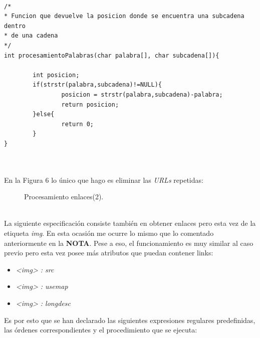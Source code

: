 \documentclass[10pt, a4paper,spanish]{article}
\begin{document}
\begin{lstlisting}

/*
* Funcion que devuelve la posicion donde se encuentra una subcadena dentro 
* de una cadena
*/
int procesamientoPalabras(char palabra[], char subcadena[]){

        int posicion;
        if(strstr(palabra,subcadena)!=NULL){
                posicion = strstr(palabra,subcadena)-palabra;
                return posicion;
        }else{
                return 0;
        }
}


\end{lstlisting}

\noindent \\ En la Figura 6 lo único que hago es eliminar las \textit{URLs} repetidas:

\begin{figure}[H]
  \centering
  \caption{Procesamiento enlaces(2).}
\end{figure}

\noindent {}
\bigskip
\noindent \\ La siguiente especificación consiste también en obtener enlaces pero esta vez de la etiqueta \textit{img}. En esta ocasión me ocurre lo mismo que lo comentado anteriormente en la \textbf{NOTA}. Pese a eso, el funcionamiento es muy similar al caso previo pero esta vez posee más atributos que puedan contener links:

\begin{itemize}
    \item \textit{<img> : src}
    \item \textit{<img> : usemap}
    \item \textit{<img> : longdesc}
\end{itemize}
\newpage
\noindent Es por esto que se han declarado las siguientes expresiones regulares predefinidas, las órdenes correspondientes y el procedimiento que se ejecuta:
\end{document}
